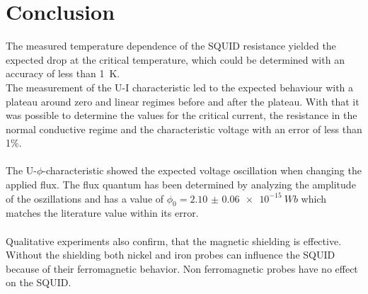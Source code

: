 \documentclass[12pt,a4paper]{article}
\begin{document}
\section{Conclusion}
The measured temperature dependence of the SQUID resistance yielded the expected drop at the critical temperature, which could be determined with an accuracy of less than \SI{1}{K}. \\
The measurement of the U-I characteristic led to the expected behaviour with a plateau around zero and linear regimes before and after the plateau. With that it was possible to determine the values for the critical current, the resistance in the normal conductive regime and the characteristic voltage with an error of less than 1\%.\\
\\
The U-$\phi$-characteristic showed the expected voltage oscillation when changing the applied flux. The flux quantum has been determined by analyzing the amplitude of the oszillations and has a value of $\phi_0 =  \SI{2.10(6)e-15}{Wb}$ which matches the literature value within its error.\\
\\
Qualitative experiments also confirm, that the magnetic shielding is effective. Without the shielding both nickel and iron probes can influence the SQUID because of their ferromagnetic behavior. Non ferromagnetic probes have no effect on the SQUID.
\end{document}
